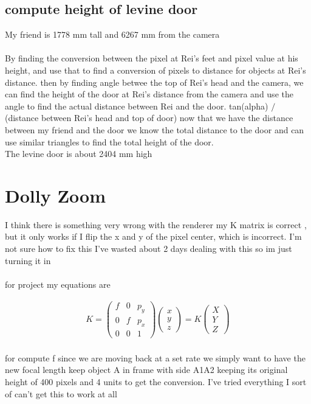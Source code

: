 \documentclass[11pt,english]{article}
\begin{document}
\subsection*{compute height of levine door}
My friend is 1778 mm tall 
and 6267 mm from the camera 
\paragraph{}
By finding the conversion between the pixel at Rei's feet and pixel value at his height, 
and use that to find a conversion of pixels to distance for objects at Rei's distance.
then by finding angle betwee the top of Rei's head and the camera, we can find the height of the door at Rei's distance from the camera
and use the angle to find the actual distance between Rei and the door. tan(alpha) $/$ (distance between Rei's head and top of door)
now that we have the distance between my friend and the door we know the total distance to the door and can use similar triangles to find the total height of the door. \\ 
The levine door is about  
2404 mm high 

\section*{Dolly Zoom}
I think there is something very wrong with the renderer 
my K matrix is correct , but it only works if I flip the x and y of the pixel center, which is incorrect. 
I'm not sure how to fix this I've wasted about 2 days dealing with this so im just turning it in 
\paragraph{}
for project my equations are 

\begin{align}
K =\begin{pmatrix}f& 0 &p_y \\ 0 & f& p_x\\ 0& 0 &1\end{pmatrix} 
\begin{pmatrix} x \\ y \\ z\end{pmatrix} = K \begin{pmatrix} X \\ Y\\ Z\end{pmatrix}
\end{align}
\paragraph{}
for compute f 
since we are moving back at a set rate we simply want to have the new focal length keep object A in frame with side A1A2 keeping its original height of 400 pixels and 4 units
to get the conversion.
I've tried everything I sort of can't get this to work at all
\end{document}
